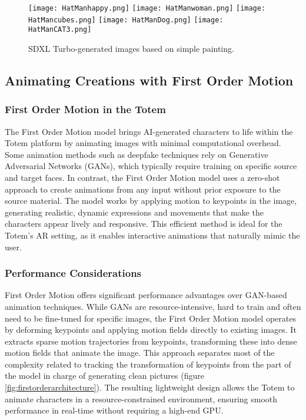 \begin{figure}[h!]
    \centering
    \texttt{[image: HatManhappy.png]}
    \texttt{[image: HatManwoman.png]}
    \texttt{[image: HatMancubes.png]}
    \texttt{[image: HatManDog.png]}
    \texttt{[image: HatManCAT3.png]}
    \caption{SDXL Turbo-generated images based on simple painting.}
    \vspace{0.1cm}
    \label{fig:sdxlpainting}
\end{figure}

\subsection{Animating Creations with First Order Motion}

\subsubsection{First Order Motion in the Totem}
The First Order Motion model\cite{Siarohin_2019_NeurIPS} brings AI-generated characters to life within the Totem platform by animating images with minimal computational overhead. 
Some animation methods such as deepfake techniques\cite{perov2020deepfacelab} rely on Generative Adversarial Networks (GANs)\cite{goodfellow2014generative}, which typically require training on specific source and target faces.
In contrast, the First Order Motion model uses a zero-shot approach to create animations from any input without prior exposure to the source material.
The model works by applying motion to keypoints in the image, generating realistic, dynamic expressions and movements that make the characters appear lively and responsive.
This efficient method is ideal for the Totem’s AR setting, as it enables interactive animations that naturally mimic the user.

\subsubsection{Performance Considerations}
First Order Motion offers significant performance advantages over GAN-based animation techniques.
While GANs are resource-intensive, hard to train and often need to be fine-tuned for specific images, the First Order Motion model operates by deforming keypoints and applying motion fields directly to existing images.
It extracts sparse motion trajectories from keypoints, transforming these into dense motion fields that animate the image.
This approach separates most of the complexity related to tracking the transformation of keypoints from the part of the model in charge of generating clean pictures (figure \ref{fig:firstorderarchitecture}).
The resulting lightweight design allows the Totem to animate characters in a resource-constrained environment, ensuring smooth performance in real-time without requiring a high-end GPU.

